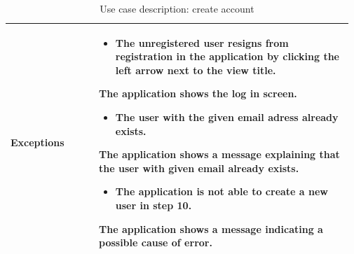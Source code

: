 \begin{table}[H]
\begin{tabular}{@{}p{0.25\linewidth} p{0.72\linewidth}@{}}
		\textbf{Exceptions}         & \begin{itemize}[leftmargin=.4cm,noitemsep,topsep=0pt,before=\vspace{-3mm}]
		   \item The unregistered user resigns from registration in the application by clicking the left arrow next to the view title. 
		\end{itemize}
		The application shows the log in screen.\begin{itemize}[leftmargin=.4cm,noitemsep,topsep=0pt]
		   \item The user with the given email adress already exists. 
		\end{itemize}
		The application shows a message explaining that the user with given email already exists.
	    \begin{itemize}[leftmargin=.4cm,noitemsep,topsep=0pt]
		   \item The application is not able to create a new user in step 10. 
		\end{itemize}
		The application shows a message indicating a possible cause of error.
	    \\\bottomrule
	\end{tabular}
	\caption{Use case description: create account} 
\end{table}


